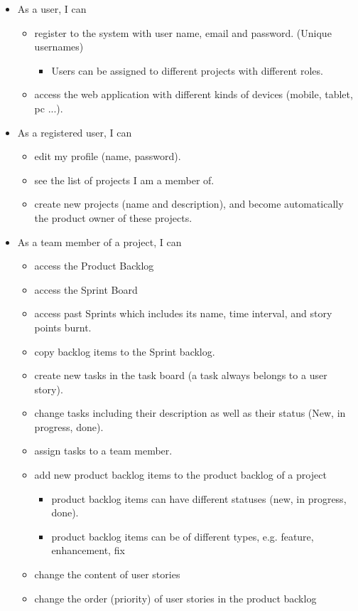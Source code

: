 \documentclass[
	accentcolor=tud1a %
]{tudreport}
\begin{document}
\begin{itemize}
	\item As a user, I can
	\begin{itemize}
		\item register to the system with user name, email and password. (Unique usernames)
		\begin{itemize}
			\item Users can be assigned to different projects with different roles.
		\end{itemize}
		\item access the web application with different kinds of devices (mobile, tablet, pc ...).
	\end{itemize}
	
	\item As a registered user, I can
	\begin{itemize}
		\item edit my profile (name, password).
		\item see the list of projects I am a member of.
		\item create new projects (name and description), and become automatically the product owner of these projects.
	\end{itemize}

	\item  As a team member of a project, I can
	\begin{itemize}
		\item access the Product Backlog
		\item access the Sprint Board
		\item access past Sprints which includes its name, time interval, and story points burnt.
		\item copy backlog items to the Sprint backlog.
		\item create new tasks in the task board (a task always belongs to a user story).
		\item change tasks including their description as well as their status (New, in progress, done).
		\item assign tasks to a team member.
		\item add new product backlog items to the product backlog of a project
		\begin{itemize}
			\item product backlog items can have different statuses (new, in progress, done).
			\item product backlog items can be of different types, e.g. feature, enhancement, fix
		\end{itemize}
		\item change the content of user stories
		\item change the order (priority) of user stories in the product backlog
	\end{itemize}
	

\end{itemize}
\end{document}
